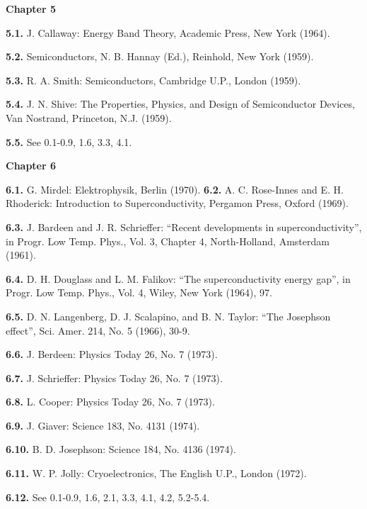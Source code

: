 \bigskip

{\large{\sffamily\bfseries Chapter 5}}

{\small

\textbf{5.1.} J. Callaway: Energy Band Theory, Academic Press, New York (1964).

\textbf{5.2.} Semiconductors, N. B. Hannay (Ed.), Reinhold, New York (1959).

\textbf{5.3.} R. A. Smith: Semiconductors, Cambridge U.P., London (1959).

\textbf{5.4.} J. N. Shive: The Properties, Physics, and Design of Semiconductor Devices, Van Nostrand, Princeton, N.J. (1959).

\textbf{5.5.} See 0.1-0.9, 1.6, 3.3, 4.1.

}

\bigskip

{\large{\sffamily\bfseries Chapter 6}}

{\small

\textbf{6.1.} G. Mirdel: Elektrophysik, Berlin (1970).
\textbf{6.2.} A. C. Rose-Innes and E. H. Rhoderick: Introduction to Superconductivity, Pergamon Press, Oxford (1969).

\textbf{6.3.} J. Bardeen and J. R. Schrieffer: ``Recent developments in superconductivity'', in Progr. Low Temp. Phys., Vol. 3, Chapter 4, North-Holland, Amsterdam (1961).

\textbf{6.4.} D. H. Douglass and L. M. Falikov: ``The superconductivity energy gap'', in Progr. Low Temp. Phys., Vol. 4, Wiley, New York (1964), 97.

\textbf{6.5.} D. N. Langenberg, D. J. Scalapino, and B. N. Taylor: ``The Josephson effect'', Sci. Amer. 214, No. 5 (1966), 30-9.

\textbf{6.6.} J. Berdeen: Physics Today 26, No. 7 (1973).

\textbf{6.7.} J. Schrieffer: Physics Today 26, No. 7 (1973).

\textbf{6.8.} L. Cooper: Physics Today 26, No. 7 (1973).

\textbf{6.9.} J. Giaver: Science 183, No. 4131 (1974).

\textbf{6.10.} B. D. Josephson: Science 184, No. 4136 (1974).

\textbf{6.11.} W. P. Jolly: Cryoelectronics, The English U.P., London (1972).

\textbf{6.12.} See 0.1-0.9, 1.6, 2.1, 3.3, 4.1, 4.2, 5.2-5.4.

}

\bigskip

